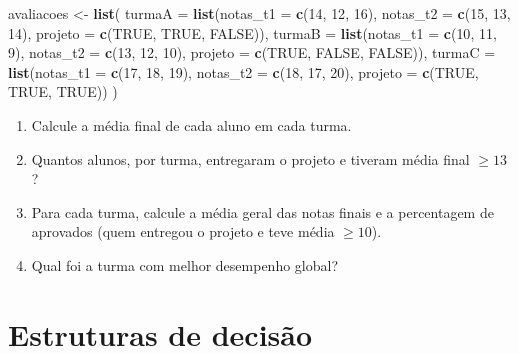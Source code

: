 \documentclass[
  portuguese,
  11pt,
  openany]{book}
\newenvironment{Shaded}{\begin{snugshade}}{\end{snugshade}}
\newcommand{\AttributeTok}[1]{\textcolor[rgb]{0.13,0.29,0.53}{#1}}
\newcommand{\ConstantTok}[1]{\textcolor[rgb]{0.56,0.35,0.01}{#1}}
\newcommand{\DecValTok}[1]{\textcolor[rgb]{0.00,0.00,0.81}{#1}}
\newcommand{\FunctionTok}[1]{\textcolor[rgb]{0.13,0.29,0.53}{\textbf{#1}}}
\newcommand{\NormalTok}[1]{#1}
\newcommand{\OtherTok}[1]{\textcolor[rgb]{0.56,0.35,0.01}{#1}}
\providecommand{\tightlist}{%
  \setlength{\itemsep}{0pt}\setlength{\parskip}{0pt}}
\begin{document}
\begin{Shaded}
\begin{Highlighting}[]
\NormalTok{avaliacoes }\OtherTok{\textless{}{-}} \FunctionTok{list}\NormalTok{(}
  \AttributeTok{turmaA =} \FunctionTok{list}\NormalTok{(}\AttributeTok{notas\_t1 =} \FunctionTok{c}\NormalTok{(}\DecValTok{14}\NormalTok{, }\DecValTok{12}\NormalTok{, }\DecValTok{16}\NormalTok{), }\AttributeTok{notas\_t2 =} \FunctionTok{c}\NormalTok{(}\DecValTok{15}\NormalTok{, }\DecValTok{13}\NormalTok{, }\DecValTok{14}\NormalTok{),}
                \AttributeTok{projeto =} \FunctionTok{c}\NormalTok{(}\ConstantTok{TRUE}\NormalTok{, }\ConstantTok{TRUE}\NormalTok{, }\ConstantTok{FALSE}\NormalTok{)),}
  \AttributeTok{turmaB =} \FunctionTok{list}\NormalTok{(}\AttributeTok{notas\_t1 =} \FunctionTok{c}\NormalTok{(}\DecValTok{10}\NormalTok{, }\DecValTok{11}\NormalTok{, }\DecValTok{9}\NormalTok{), }\AttributeTok{notas\_t2 =} \FunctionTok{c}\NormalTok{(}\DecValTok{13}\NormalTok{, }\DecValTok{12}\NormalTok{, }\DecValTok{10}\NormalTok{),}
                \AttributeTok{projeto =} \FunctionTok{c}\NormalTok{(}\ConstantTok{TRUE}\NormalTok{, }\ConstantTok{FALSE}\NormalTok{, }\ConstantTok{FALSE}\NormalTok{)),}
  \AttributeTok{turmaC =} \FunctionTok{list}\NormalTok{(}\AttributeTok{notas\_t1 =} \FunctionTok{c}\NormalTok{(}\DecValTok{17}\NormalTok{, }\DecValTok{18}\NormalTok{, }\DecValTok{19}\NormalTok{), }\AttributeTok{notas\_t2 =} \FunctionTok{c}\NormalTok{(}\DecValTok{18}\NormalTok{, }\DecValTok{17}\NormalTok{, }\DecValTok{20}\NormalTok{),}
                \AttributeTok{projeto =} \FunctionTok{c}\NormalTok{(}\ConstantTok{TRUE}\NormalTok{, }\ConstantTok{TRUE}\NormalTok{, }\ConstantTok{TRUE}\NormalTok{))}
\NormalTok{)}
\end{Highlighting}
\end{Shaded}

\begin{enumerate}
\def\labelenumi{(\alph{enumi})}
\tightlist
\item
  Calcule a média final de cada aluno em cada turma.
\item
  Quantos alunos, por turma, entregaram o projeto e tiveram média final \(\geq
  13\)?
\item
  Para cada turma, calcule a média geral das notas finais e a percentagem de
  aprovados (quem entregou o projeto e teve média \(\geq 10\)).
\item
  Qual foi a turma com melhor desempenho global?
\end{enumerate}

\chapter{Estruturas de decisão}\label{selecao}
\end{document}
